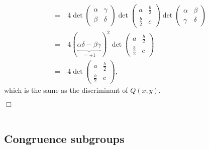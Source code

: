 \documentclass{article}
\begin{document}
\begin{enumerate}
\begin{align*}
    = & \:
    4 \det
    \begin{pmatrix}
      \alpha & \gamma \\
      \beta & \delta
    \end{pmatrix}
    \det\begin{pmatrix}
      a & \frac{b}{2} \\
      \frac{b}{2} & c
    \end{pmatrix}
    \det\begin{pmatrix}
      \alpha & \beta \\
      \gamma & \delta
    \end{pmatrix} \\
    = & \:
    4 (\underbrace{\alpha \delta - \beta \gamma}_{= \pm 1})^2
    \det\begin{pmatrix}
      a & \frac{b}{2} \\
      \frac{b}{2} & c
    \end{pmatrix} \\
    = & \:
    4
    \det\begin{pmatrix}
      a & \frac{b}{2} \\
      \frac{b}{2} & c
    \end{pmatrix},
  \end{align*}
  which is the same as the discriminant of $Q(x,y)$.
\end{enumerate}
$\Box$ \\\\






\subsection*{Congruence subgroups \\}
\end{document}
